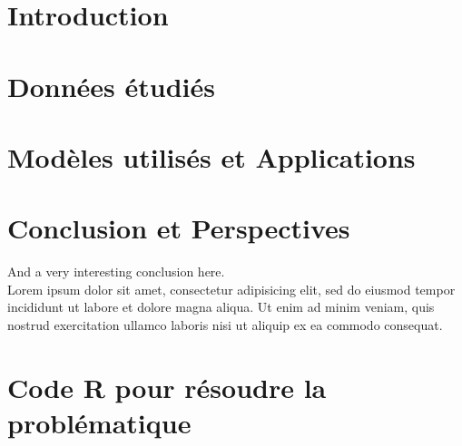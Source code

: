 \documentclass[a4paper, oneside, 12pt, final]{extreport}
\begin{document}


\tableofcontents

\listoffigures

\listoftables

\listofalgorithms

\cleardoublepage

\newpage
{}
\chapter*{Introduction}
\label{chap:general_intorduction}



\chapter{Données étudiés}%
\label{chap:chapterone}


\chapter{Modèles utilisés et Applications}
\label{chap:2}



\chapter*{Conclusion et Perspectives}
\label{chap:conclusion}
%
And a very interesting conclusion here\@. ~\\
Lorem ipsum dolor sit amet, consectetur adipisicing elit, sed do eiusmod
tempor incididunt ut labore et dolore magna aliqua. Ut enim ad minim veniam,
quis nostrud exercitation ullamco laboris nisi ut aliquip ex ea commodo
consequat.

\newpage
\appendix
{}

\chapter{Code R pour résoudre la problématique}
\label{chap:appendix}
\end{document}
